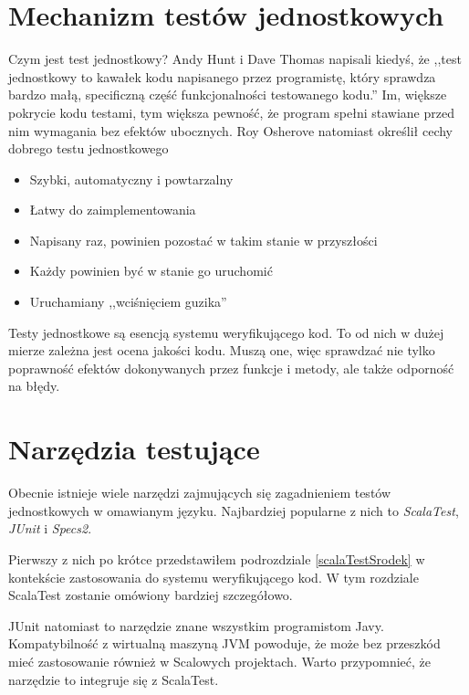 \documentclass[brudnopis]{xmgr}
\begin{document}
\section{Mechanizm testów jednostkowych}

Czym jest test jednostkowy? Andy Hunt i Dave Thomas napisali kiedyś, że ,,test jednostkowy to kawałek kodu napisanego przez programistę, który sprawdza bardzo małą, specificzną część funkcjonalności testowanego kodu.''\cite[s.3]{Hunt:2003:PUT} Im, większe pokrycie kodu testami, tym większa pewność, że program spełni stawiane przed nim wymagania bez efektów ubocznych. Roy Osherove natomiast określił cechy dobrego testu jednostkowego\cite[s. 6]{Osherove:2009:TAOUT} 

\begin{itemize}
\item Szybki, automatyczny i powtarzalny
\item Łatwy do zaimplementowania
\item Napisany raz, powinien pozostać w takim stanie w przyszłości
\item Każdy powinien być w stanie go uruchomić
\item Uruchamiany ,,wciśnięciem guzika'' 
\end{itemize}

Testy jednostkowe są esencją systemu weryfikującego kod. To od nich w dużej mierze zależna jest ocena jakości kodu. Muszą one, więc sprawdzać nie tylko poprawność efektów dokonywanych przez funkcje i metody, ale także odporność na błędy.  
    
\section{Narzędzia testujące}

Obecnie istnieje wiele narzędzi zajmujących się zagadnieniem testów jednostkowych w omawianym języku. Najbardziej popularne z nich to \emph{ScalaTest}, \emph{JUnit} i \emph{Specs2}.

Pierwszy z nich po krótce przedstawiłem podrozdziale \ref{scalaTestSrodek} w kontekście zastosowania do systemu weryfikującego kod. W tym rozdziale ScalaTest zostanie omówiony bardziej szczegółowo. 

JUnit natomiast to narzędzie znane wszystkim programistom Javy. Kompatybilność z wirtualną maszyną JVM powoduje, że może bez przeszkód mieć zastosowanie również w Scalowych projektach. Warto przypomnieć, że narzędzie to integruje się z ScalaTest. 
\end{document}
